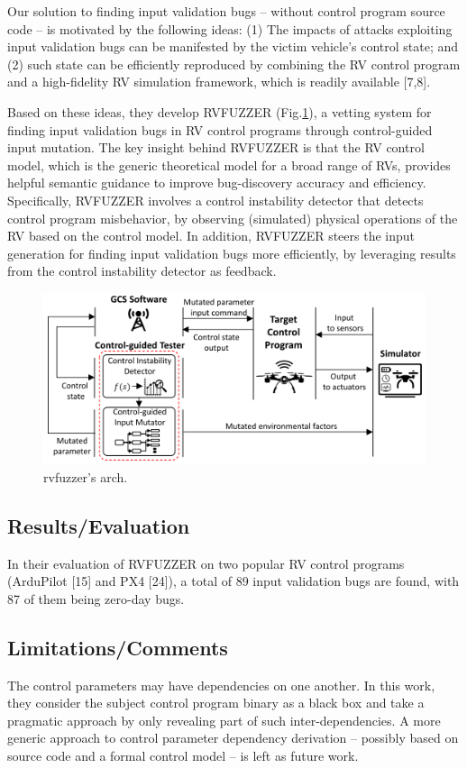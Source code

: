 Our solution to finding input validation bugs – without control program source code – is motivated by the following ideas: (1) The impacts of attacks exploiting input validation bugs can be manifested by the victim vehicle’s control state; and (2) such state can be efficiently reproduced by combining the RV control program and a high-fidelity RV simulation framework, which is readily available [7,8].

Based on these ideas, they develop RVFUZZER (Fig.\ref{fig:rvfuzzer}), a vetting system for finding input validation bugs in RV control programs through control-guided input mutation. The key insight behind RVFUZZER is that the RV control model, which is the generic theoretical model for a broad range of RVs, provides helpful semantic guidance to improve bug-discovery accuracy and efficiency. Specifically, RVFUZZER involves a control instability detector that detects control program misbehavior, by observing (simulated) physical operations of the RV based on the control model. In addition, RVFUZZER steers the input generation for finding input validation bugs more efficiently, by leveraging results from the control instability detector as feedback. 
\begin{figure}[h]
    \centering
    \includegraphics[width=\linewidth]{rvfuzzer.png} %
    \caption{rvfuzzer's arch.}	
    \label{fig:rvfuzzer}
\end{figure}
\subsection{Results/Evaluation}
In their evaluation of RVFUZZER on two popular RV control programs (ArduPilot [15] and PX4 [24]), a total of 89 input validation bugs are found, with 87 of them being zero-day bugs.
\subsection{Limitations/Comments}
The control parameters may have dependencies on one another.  In this work, they consider the subject control program binary as a black box and take a pragmatic approach by only revealing part of such inter-dependencies. A more generic approach to control parameter dependency derivation – possibly based on source code and a formal control model – is left as future work.


